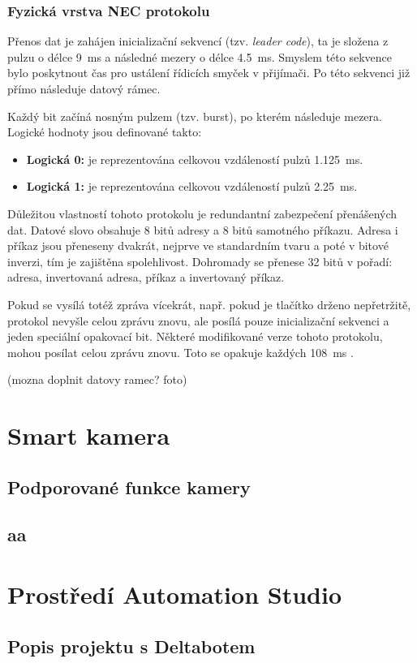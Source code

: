 \subsubsection{Fyzická vrstva NEC protokolu}

Přenos dat je zahájen inicializační sekvencí (tzv. \textit{leader code}), ta je složena z pulzu o délce \SI{9}{\milli\second} a následné mezery o délce \SI{4.5}{\milli\second}. Smyslem této sekvence bylo poskytnout čas pro ustálení řídicích smyček v přijímači. Po této sekvenci již přímo následuje datový rámec.

Každý bit začíná nosným pulzem (tzv. burst), po kterém následuje mezera. Logické hodnoty jsou definované takto:
\begin{itemize}
    \item \textbf{Logická 0:} je reprezentována celkovou vzdáleností pulzů \SI{1.125}{\milli\second}.
    \item \textbf{Logická 1:} je reprezentována celkovou vzdáleností pulzů \SI{2.25}{\milli\second}.
\end{itemize}

Důležitou vlastností tohoto protokolu je redundantní zabezpečení přenášených dat. Datové slovo obsahuje 8 bitů adresy a 8 bitů samotného příkazu. Adresa i příkaz jsou přeneseny dvakrát, nejprve ve standardním tvaru a poté v bitové inverzi, tím je zajištěna spolehlivost. Dohromady se přenese 32 bitů v pořadí: adresa, invertovaná adresa, příkaz a invertovaný příkaz.

Pokud se vysílá totéž zpráva vícekrát, např. pokud je tlačítko drženo nepřetržitě, protokol nevyšle celou zprávu znovu, ale posílá pouze inicializační sekvenci a jeden speciální opakovací bit. Některé modifikované verze tohoto protokolu, mohou posílat celou zprávu znovu. Toto se opakuje každých \SI{108}{\milli\second} \cite{nec}.

(mozna doplnit datovy ramec? foto)

\section{Smart kamera}

\subsection{Podporované funkce kamery}

\subsection{aa}


\section{Prostředí Automation Studio}

\subsection{Popis projektu s Deltabotem}